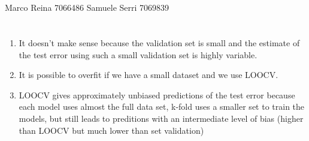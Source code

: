 \documentclass[12pt]{article}
\begin{document}
\section*{}
Marco Reina 7066486 \newline
Samuele Serri 7069839 \newline
\section*{}
\begin{enumerate}
    \item 
It doesn't make sense because the validation set is small and the estimate of the test error using such a small validation set is highly variable.
    \item
It is possible to overfit if we have a small dataset and we use LOOCV.
    \item
LOOCV gives approximately unbiased predictions of the test error because each model uses almost the full data set,
k-fold uses a smaller set to train the models, but still leads to preditions with an intermediate level of bias (higher than LOOCV but much lower than set validation)
\end{enumerate}
\end{document}
